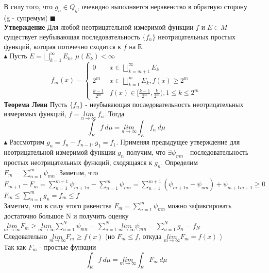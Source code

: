  В силу того, что $g_n \in Q_g$, очевидно выполняется неравенство в обратную сторону (g - супремум) $\blacksquare$
 \\
 \textbf{Утверждение}
Для любой неотрицательной измеримой функции $f$ и $E \in M$ существует неубывающая последовательность $\{f_n\}$ неотрицательных простых функций, которая поточечно сходится к $f$ на Е.
\\
$\blacktriangle$ Пусть $E = \bigsqcup_{k=1}^{\infty}E_k, \ \mu(E_k) < \infty$
\begin{equation*}
f_m(x) = 
 \begin{cases}
   0 & x \in \bigsqcup_{k = m+1}^{\infty} E_k\\
   2^m & x \in \bigsqcup_{k = 1}^{m} E_k, f(x) \geq 2^m \\
   \frac{k-1}{2^m} & f(x) \in [\frac{k-1}{2^m}, \frac{k}{2^m}), 1 \leq k \leq 2^m
   
 \end{cases}
\end{equation*}
\textbf{Теорема Леви} Пусть $\{f_n\}$ - неубывающая последовательность неотрицательных измеримых функций, $f = \underset{n\rightarrow \infty}{lim} \ f_n$. Тогда
$$\int_E f \ d\mu = \underset{n\rightarrow \infty}{lim} \int_E f_n \ d\mu $$
$\blacktriangle$ Рассмотрим  $g_n = f_n - f_{n-1}, g_1 = f_1$. Применяя предыдущее утверждение для неотрицательной измеримой функции $g_n$ получим, что $\exists \psi_{mn}$ - последовательность простых неотрицательных функций, сходящаяся к $g_n$.
Определим $F_m = \sum\limits_{n=1}^{m} \psi_{mn}$. Заметим, что $F_{m+1} - F_m = \sum\limits_{n=1}^{m+1}\psi_{m+1 n} - \sum\limits_{n=1}^{m}\psi_{mn} = \sum\limits_{n=1}^{m+1}(\psi_{m+1 n} - \psi_{m n}) + \psi_{m+1 m+1} \geq 0$\\
$F_m \leq \sum\limits_{n=1}^{m}g_n = f_m \leq f$\\
Заметим, что в силу этого равенства $F_m = \sum\limits_{n=1}^{m} \psi_{mn}$ можно зафиксировать достаточно большое N и получить  оценку $\underset{m\rightarrow \infty}{lim} F_m \geq \underset{m\rightarrow \infty}{lim}\sum\limits_{n=1}^{N} \psi_{mn} = \sum\limits_{n=1}^{N} \underset{m\rightarrow \infty}{lim} \psi_{mn} = \sum\limits_{n=1}^{N} g_n = f_N$\\
Следовательно $\underset{m\rightarrow \infty}{lim} F_m \geq f(x)$ (но $F_m \leq f$, откуда $\underset{m\rightarrow \infty}{lim} F_m = f(x)$ )\\
Так как $F_m$ - простые функции
$$\int_E f \ d\mu = \underset{m\rightarrow \infty}{lim} \int_E F_m \ d\mu $$
\\
